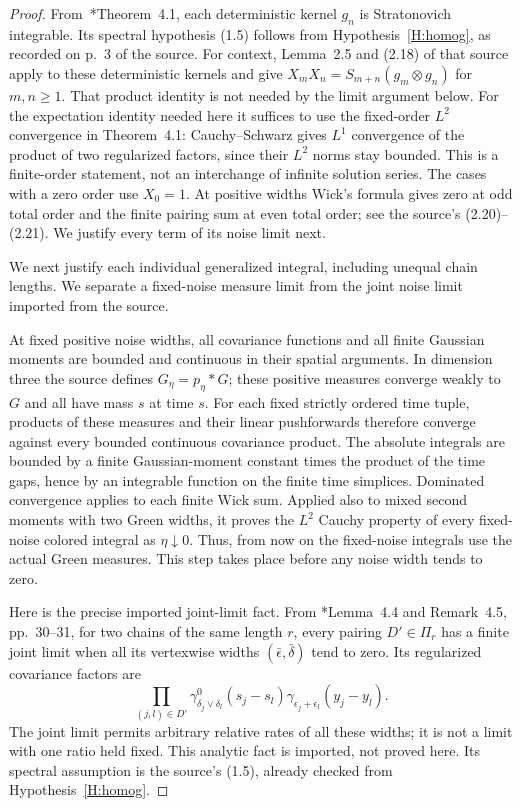 \documentclass[12pt]{article}
\numberwithin{equation}{section}
\theoremstyle{definition}
\begin{document}
\begin{proof}
  From~\cite{chen:author2026:time-dependency}*{Theorem~4.1}, each
  deterministic kernel $g_n$ is Stratonovich integrable. Its spectral
  hypothesis (1.5) follows from Hypothesis~\ref{H:homog}, as recorded
  on p.~3 of the source. For context, Lemma~2.5 and
  (2.18) of that source apply to these deterministic kernels and give
  $X_mX_n=S_{m+n}(g_m\otimes g_n)$ for $m,n\ge1$.
  That product identity is not needed by the limit argument below.
  For the expectation identity needed here it suffices to use the fixed-order
  $L^2$ convergence in Theorem~4.1: Cauchy--Schwarz gives $L^1$ convergence
  of the product of two regularized factors, since their $L^2$ norms stay
  bounded. This is a finite-order statement, not an interchange of infinite
  solution series. The cases with a zero order use $X_0=1$.
  At positive widths Wick's formula gives zero at odd total order and
  the finite pairing sum at even total order; see the source's
  (2.20)--(2.21). We justify every term of its noise limit next.

  We next justify each individual generalized integral, including unequal
  chain lengths. We separate a fixed-noise measure limit from the joint
  noise limit imported from the source.

  At fixed positive noise widths, all covariance functions and all finite
  Gaussian moments are bounded and continuous in their spatial arguments.
  In dimension three the source defines $G_\eta=p_\eta*G$; these positive
  measures converge weakly to $G$ and all have mass $s$ at time $s$.
  For each fixed strictly ordered time tuple, products of these measures
  and their linear pushforwards therefore converge against every bounded
  continuous covariance product. The absolute integrals are bounded by
  a finite Gaussian-moment constant times the product of the time gaps,
  hence by an integrable function on the finite time simplices. Dominated
  convergence applies to each finite Wick sum. Applied also to mixed
  second moments with two Green widths, it proves the $L^2$ Cauchy
  property of every fixed-noise colored integral as $\eta\downarrow0$.
  Thus, from now on the fixed-noise integrals use the actual Green
  measures. This step takes place before any noise width tends to zero.

  Here is the precise imported joint-limit fact. From
  \cite{chen:author2026:time-dependency}*{Lemma~4.4 and Remark~4.5,
  pp.~30--31}, for two chains of the same length $r$, every pairing
  $D'\in\Pi_r$ has a finite joint limit when all its vertexwise widths
  $(\bar\epsilon,\bar\delta)$ tend to zero. Its regularized covariance
  factors are
  \[
    \prod_{(j,l)\in D'}
    \gamma^0_{\delta_j\vee\delta_l}(s_j-s_l)
    \gamma_{\epsilon_j+\epsilon_l}(y_j-y_l).
  \]
  The joint limit permits arbitrary relative rates of all these widths;
  it is not a limit with one ratio held fixed. This analytic fact is
  imported, not proved here. Its spectral assumption is the source's
  (1.5), already checked from Hypothesis~\ref{H:homog}.


\end{proof}
\end{document}
